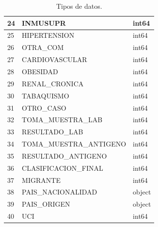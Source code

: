 \begin{table}[h]
{\begin{tabular}{|l|l|l|}
24 & INMUSUPR                & int64      \\ \hline
25 & HIPERTENSION            & int64      \\ \hline
26 & OTRA\_COM               & int64      \\ \hline
27 & CARDIOVASCULAR          & int64      \\ \hline
28 & OBESIDAD                & int64      \\ \hline
29 & RENAL\_CRONICA          & int64      \\ \hline
30 & TABAQUISMO              & int64      \\ \hline
31 & OTRO\_CASO              & int64      \\ \hline
32 & TOMA\_MUESTRA\_LAB      & int64      \\ \hline
33 & RESULTADO\_LAB          & int64      \\ \hline
34 & TOMA\_MUESTRA\_ANTIGENO & int64      \\ \hline
35 & RESULTADO\_ANTIGENO     & int64      \\ \hline
36 & CLASIFICACION\_FINAL    & int64      \\ \hline
37 & MIGRANTE                & int64      \\ \hline
38 & PAIS\_NACIONALIDAD      & object     \\ \hline
39 & PAIS\_ORIGEN            & object     \\ \hline
40 & UCI                     & int64      \\ \hline
\end{tabular}
}
\caption{Tipos de datos.}
\label{tabla:autores}
\end{table}

\clearpage
